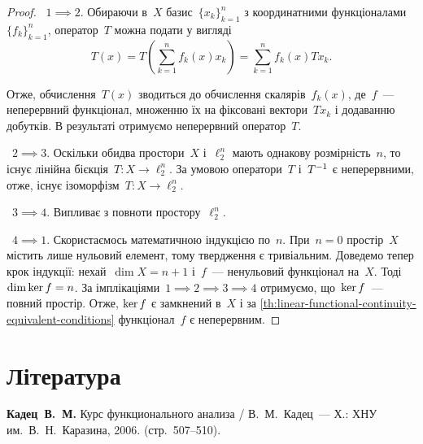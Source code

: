 \begin{proof}
   ~$1 \implies 2$. Обираючи в~$X$ базис~$\{x_k\}_{k = 1}^n$ з координатними функціоналами~$\{f_k\}_{k = 1}^n$, оператор~$T$ можна подати у вигляді
    \begin{equation*}
        T(x) = T \left( \sum_{k = 1}^n f_k(x) x_k \right) = \sum_{k = 1}^n f_k(x) T x_k. 
    \end{equation*}
    
    Отже, обчислення~$T(x)$ зводиться до обчислення скалярів~$f_k(x)$, де~$f$~--- неперервний функціонал, множенню їх на фіксовані вектори~$Tx_k$ і додаванню добутків. В результаті отримуємо неперервний оператор~$T$.
    
   ~$2 \implies 3$. Оскільки обидва простори~$X$ і~$\ell_2^n$ мають однакову розмірність~$n$, то існує лінійна бієкція~$T: X \to \ell_2^n$. За умовою оператори~$T$ і~$T^{-1}$ є неперервними, отже, існує ізоморфізм~$T: X \to \ell_2^n$.
    
   ~$3 \implies 4$. Випливає з повноти простору~$\ell_2^n$.

   ~$4 \implies 1$. Скористаємось математичною індукцією по~$n$. При~$n = 0$ простір~$X$ містить лише нульовий елемент, тому твердження є тривіальним. Доведемо тепер крок індукції: нехай~$\dim X = n + 1$ і~$f$~--- ненульовий функціонал на~$X$. Тоді~$\dim \operatorname{ker} f = n$. За імплікаціями~$1 \implies 2 \implies 3 \implies 4$ отримуємо, що~$\operatorname{ker} f$~--- повний простір. Отже, $\operatorname{ker} f$ є замкнений в~$X$ і за \cref{th:linear-functional-continuity-equivalent-conditions} функціонал~$f$ є неперервним.
\end{proof}

\section{Література}

\begin{enumerate}[label={[\arabic*]}]
\item \textbf{Кадец~В.~М.}
Курс функционального анализа /
В.~М.~Кадец~---
Х.: ХНУ им.~В.~Н.~Каразина, 2006. (стр.~507--510).
\end{enumerate}
